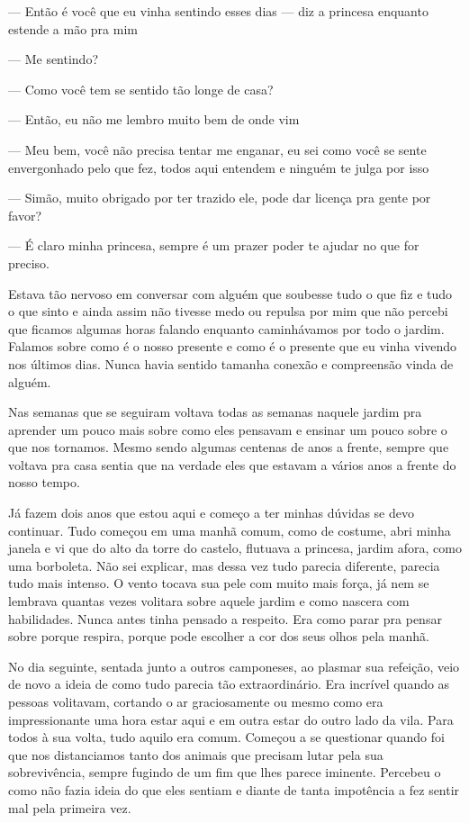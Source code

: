 — Então é você que eu vinha sentindo esses dias — diz a princesa enquanto estende a mão pra mim

— Me sentindo? 

— Como você tem se sentido tão longe de casa?

— Então, eu não me lembro muito bem de onde vim

— Meu bem, você não precisa tentar me enganar, eu sei como você se sente envergonhado pelo que fez, todos aqui entendem e ninguém te julga por isso

— Simão, muito obrigado por ter trazido ele, pode dar licença pra gente por favor?

— É claro minha princesa, sempre é um prazer poder te ajudar no que for preciso.

Estava tão nervoso em conversar com alguém que soubesse tudo o que fiz e tudo o que sinto e ainda assim não tivesse medo ou repulsa por mim que não percebi que ficamos algumas horas falando enquanto caminhávamos por todo o jardim. Falamos sobre como é o nosso presente e como é o presente que eu vinha vivendo nos últimos dias. Nunca havia sentido tamanha conexão e compreensão vinda de alguém.

Nas semanas que se seguiram voltava todas as semanas naquele jardim pra aprender um pouco mais sobre como eles pensavam e ensinar um pouco sobre o que nos tornamos. Mesmo sendo algumas centenas de anos a frente, sempre que voltava pra casa sentia que na verdade eles que estavam a vários anos a frente do nosso tempo.

Já fazem dois anos que estou aqui e começo a ter minhas dúvidas se devo continuar. Tudo começou em uma manhã comum, como de costume, abri minha janela e vi que do alto da torre do castelo, flutuava a princesa, jardim afora, como uma borboleta. Não sei explicar, mas dessa vez tudo parecia diferente, parecia tudo mais intenso. O vento tocava sua pele com muito mais força, já nem se lembrava quantas vezes volitara sobre aquele jardim e como nascera com habilidades. Nunca antes tinha pensado a respeito. Era como parar pra pensar sobre porque respira, porque pode escolher a cor dos seus olhos pela manhã.

No dia seguinte, sentada junto a outros camponeses, ao plasmar sua refeição, veio de novo a ideia de como tudo parecia tão extraordinário. Era incrível quando as pessoas volitavam, cortando o ar graciosamente ou mesmo como era impressionante uma hora estar aqui e em outra estar do outro lado da vila. Para todos à sua volta, tudo aquilo era comum. Começou a se questionar quando foi que nos distanciamos tanto dos animais que precisam lutar pela sua sobrevivência, sempre fugindo de um fim que lhes parece iminente. Percebeu o como não fazia ideia do que eles sentiam e diante de tanta impotência a fez sentir mal pela primeira vez.

